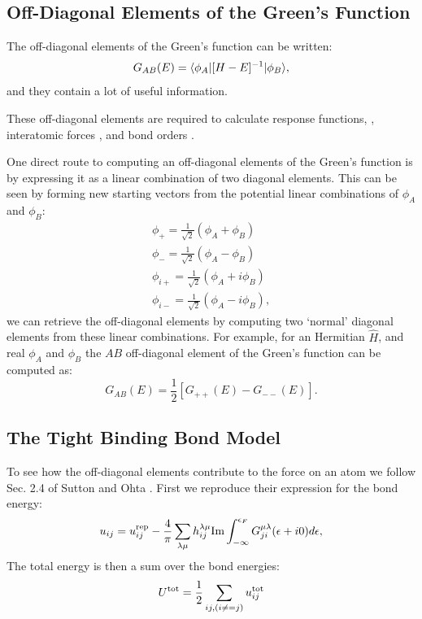 \subsection{Off-Diagonal Elements of the Green's Function}
The off-diagonal elements of the Green's function can be written:
%
\begin{equation}
G_{AB}(E) = \langle \phi_{A}|[H-E]^{-1}|\phi_{B}\rangle,
\end{equation}
%
and they contain a lot of useful information. 

These off-diagonal elements are required to calculate 
response functions, \cite{terakura78}, interatomic 
forces \cite{finnis84, finnis87, ohta87}, and bond orders 
\cite{coulson39,tersoff86,pettifor89}.

One direct route to computing an off-diagonal elements of the Green's function
is by expressing it as a linear combination of two diagonal elements. 
This can be seen by forming new starting vectors 
from the potential linear combinations of $\phi_{A}$ and $\phi_{B}$:
%
\begin{align}
\phi_{+} = \frac{1}{\sqrt{2}}(\phi_{A} + \phi_{B})\\
\phi_{-} = \frac{1}{\sqrt{2}}(\phi_{A} - \phi_{B})\\
\phi_{i+} = \frac{1}{\sqrt{2}}(\phi_{A} + i\phi_{B})\\
\phi_{i-} = \frac{1}{\sqrt{2}}(\phi_{A} - i\phi_{B}),
\end{align}
%
we can retrieve the off-diagonal elements by computing 
two `normal' diagonal elements from these linear combinations.
For example, for an Hermitian $\hat{H}$, and real $\phi_{A}$ and $\phi_{B}$ 
the $AB$ off-diagonal element of the Green's function can be computed as:
%
\begin{equation}
\label{eq:offdiaggreen}
G_{AB}(E) = \frac{1}{2}[G_{++}(E)-G_{--}(E)].
\end{equation}

\subsection{The Tight Binding Bond Model}
To see how the off-diagonal elements contribute to the force on an 
atom we follow Sec. 2.4 of Sutton \cite{sutton88} and Ohta \cite{ohta87}.
First we reproduce their expression for the bond energy:
%
\begin{equation}
\label{eq:tbenergy}
u_{ij} = u^{\rm rep}_{ij} - \frac{4}{\pi}\sum_{\lambda\mu} 
h_{ij}^{\lambda\mu}{\rm Im}\int_{-\infty}^{\epsilon_{F}}G_{ji}^{\mu\lambda}(\epsilon+i0)d\epsilon,
\end{equation}
%
The total energy is then a sum over the bond energies:
%
\begin{equation}
\label{eq:tbtoten}
U^{\rm tot} = \frac{1}{2}\sum_{ij,(i\neq=j)}u^{\rm tot}_{ij}
\end{equation}
%

